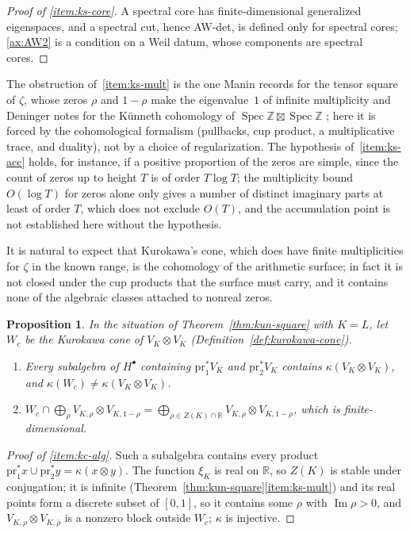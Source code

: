 \documentclass[11pt]{amsart}
\theoremstyle{plain}
\newtheorem{proposition}[theorem]{Proposition}
\theoremstyle{definition}
\theoremstyle{remark}
\numberwithin{equation}{section}
\newcommand{\R}{\mathbb{R}}
\newcommand{\Z}{\mathbb{Z}}
\DeclareMathOperator{\Spec}{Spec}
\DeclareMathOperator{\Ima}{Im}
\renewcommand{\Im}{\Ima}
\begin{document}
\begin{proof}[Proof of \ref{item:ks-core}]
A spectral core has finite-dimensional generalized eigenspaces, and a
spectral cut, hence AW-det, is defined only for spectral cores;
\ref{ax:AW2} is a condition on a Weil datum, whose components are
spectral cores.
\end{proof}

The obstruction of~\ref{item:ks-mult} is the one Manin records for the
tensor square of $\zeta$, whose zeros $\rho$ and $1-\rho$ make the
eigenvalue~$1$ of infinite multiplicity
\cite[p.~132, difficulty~(i)]{Manin1995Lectures} and Deninger notes
for the K\"unneth cohomology of $\Spec\Z\boxtimes\Spec\Z$
\cite[(7.32), p.~42]{Deninger1994Motivic}; here it is forced by
the cohomological formalism (pullbacks, cup product, a multiplicative
trace, and duality), not by a choice of regularization. The hypothesis
of~\ref{item:ks-acc} holds, for instance, if a positive proportion of
the zeros are simple, since the count of zeros up to height $T$ is of
order $T\log T$; the multiplicity bound $O(\log T)$ for zeros alone only
gives a number of distinct imaginary parts at least of order $T$, which
does not exclude $O(T)$, and the
accumulation point is not established here without the hypothesis.

It is natural to expect that Kurokawa's cone, which does have finite
multiplicities for $\zeta$ in the known range, is the cohomology of the
arithmetic surface; in fact it is not closed under the cup products
that the surface must carry, and it contains none of the algebraic
classes attached to nonreal zeros.

\begin{proposition}\label{prop:kun-cone}
In the situation of Theorem~\ref{thm:kun-square} with $K=L$, let $W_c$
be the Kurokawa cone of $V_K\otimes V_K$
(Definition~\ref{def:kurokawa-cone}).
\begin{enumerate}[label=(\roman*)]
\item\label{item:kc-alg} Every subalgebra of $H^\bullet$ containing
  $\mathrm{pr}_1^*V_K$ and $\mathrm{pr}_2^*V_K$ contains $\kappa(V_K\otimes
  V_K)$, and $\kappa(W_c)\ne\kappa(V_K\otimes V_K)$.
\item\label{item:kc-classes} $W_c\cap\bigoplus_\rho V_{K,\rho}\otimes
  V_{K,1-\rho}=\bigoplus_{\rho\in Z(K)\cap\R}V_{K,\rho}\otimes V_{K,1-\rho}$,
  which is finite-dimensional.
\end{enumerate}
\end{proposition}

\begin{proof}[Proof of \ref{item:kc-alg}]
Such a subalgebra contains every product $\mathrm{pr}_1^*x\cup
\mathrm{pr}_2^*y=\kappa(x\otimes y)$. The function $\xi_K$ is real on
$\R$, so $Z(K)$ is stable under conjugation; it is infinite
(Theorem~\ref{thm:kun-square}\ref{item:ks-mult}) and its real points
form a discrete subset of $[0,1]$, so it contains some $\rho$ with
$\Im\rho>0$, and $V_{K,\rho}\otimes V_{K,\bar\rho}$ is a nonzero block
outside $W_c$; $\kappa$ is injective.
\end{proof}
\end{document}
